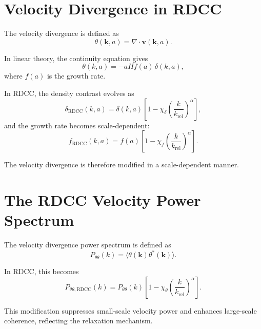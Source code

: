 \documentclass[11pt,a4paper]{article}
\begin{document}
\section{Velocity Divergence in RDCC}

The velocity divergence is defined as
\begin{equation}
    \theta(\mathbf{k},a)
    = \nabla \cdot \mathbf{v}(\mathbf{k},a).
\end{equation}

In linear theory, the continuity equation gives
\begin{equation}
    \theta(k,a)
    = -aH f(a)\,\delta(k,a),
\end{equation}
where $f(a)$ is the growth rate.

In RDCC, the density contrast evolves as
\begin{equation}
    \delta_{\mathrm{RDCC}}(k,a)
    = \delta(k,a)
      \left[
        1 - \chi_{\delta}
        \left(\frac{k}{k_{\mathrm{rel}}}\right)^{\alpha}
      \right],
\end{equation}
and the growth rate becomes scale-dependent:
\begin{equation}
    f_{\mathrm{RDCC}}(k,a)
    = f(a)
      \left[
        1 - \chi_{f}
        \left(\frac{k}{k_{\mathrm{rel}}}\right)^{\alpha}
      \right].
\end{equation}

The velocity divergence is therefore modified in a scale-dependent manner.
\section{The RDCC Velocity Power Spectrum}

The velocity divergence power spectrum is defined as
\begin{equation}
    P_{\theta\theta}(k)
    = \langle \theta(\mathbf{k}) \theta^{*}(\mathbf{k}) \rangle.
\end{equation}

In RDCC, this becomes
\begin{equation}
    P_{\theta\theta,\mathrm{RDCC}}(k)
    = P_{\theta\theta}(k)
      \left[
        1 - \chi_{\theta}
        \left(\frac{k}{k_{\mathrm{rel}}}\right)^{\alpha}
      \right].
\end{equation}

This modification suppresses small-scale velocity power and enhances large-scale 
coherence, reflecting the relaxation mechanism.
\end{document}
